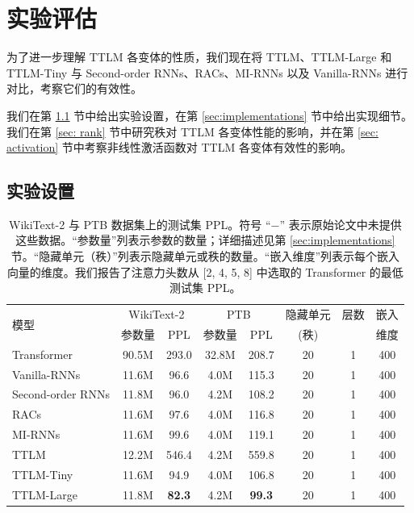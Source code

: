 \section{实验评估}
\label{sec: experiments}

为了进一步理解 TTLM 各变体的性质，我们现在将 TTLM、TTLM-Large 和 TTLM-Tiny 与 Second-order RNNs、RACs、MI-RNNs 以及 Vanilla-RNNs 进行对比，考察它们的有效性。


我们在第 \ref{sec:setting} 节中给出实验设置，在第 \ref{sec:implementations} 节中给出实现细节。我们在第 \ref{sec: rank} 节中研究秩对 TTLM 各变体性能的影响，并在第 \ref{sec: activation} 节中考察非线性激活函数对 TTLM 各变体有效性的影响。



\subsection{实验设置}
\label{sec:setting}
\begin{table}[t]
\small
\centering
  \begin{tabular}{l|cc|cc|ccc}
    \toprule
      \multirow{2}{*}{模型} & \multicolumn{2}{c|}{
      WikiText-2} &
    \multicolumn{2}{c|}{PTB} & 隐藏单元 & 层数 & 嵌入 \\

    &参数量 & PPL  & 参数量  & PPL & (秩) & & 维度\\

    \midrule
    Transformer \citep{vaswani2017attention} & 90.5M & 293.0 & 32.8M & 208.7 &20 & 1 & 400 \\
    Vanilla-RNNs \citep{mikolov2012context} & 11.6M & 96.6 & 4.0M & 115.3 & 20 & 1 & 400\\
    Second-order RNNs \citep{hochreiter1997long} & 11.8M & 96.0 & 4.2M& 108.2 & 20 & 1 & 400\\
    RACs  \citep{levine2018benefits} &11.6M& 97.6 & 4.0M  & 116.8 &20 & 1 & 400 \\
    MI-RNNs \citep{wu_multiplicative_2016} &  11.6M & 99.6 &4.0M & 119.1 & 20 & 1 & 400 \\
    \hline
    TTLM & 12.2M & 546.4 & 4.2M & 559.8 & 20& 1 & 400\\
    TTLM-Tiny & 11.6M &94.9 & 4.0M &106.8 & 20 & 1 & 400\\
    TTLM-Large &11.8M &\textbf{82.3} & 4.2M & \textbf{99.3} & 20 & 1 & 400 \\
  \bottomrule
\end{tabular}
\caption{WikiText-2 与 PTB 数据集上的测试集 PPL。符号 “$-$” 表示原始论文中未提供这些数据。“参数量”列表示参数的数量；详细描述见第 \ref{sec:implementations} 节。“隐藏单元（秩）”列表示隐藏单元或秩的数量。“嵌入维度”列表示每个嵌入向量的维度。我们报告了注意力头数从 [2, 4, 5, 8] 中选取的 Transformer 的最低测试集 PPL。\label{tab:evaluation}}
\end{table}
%
